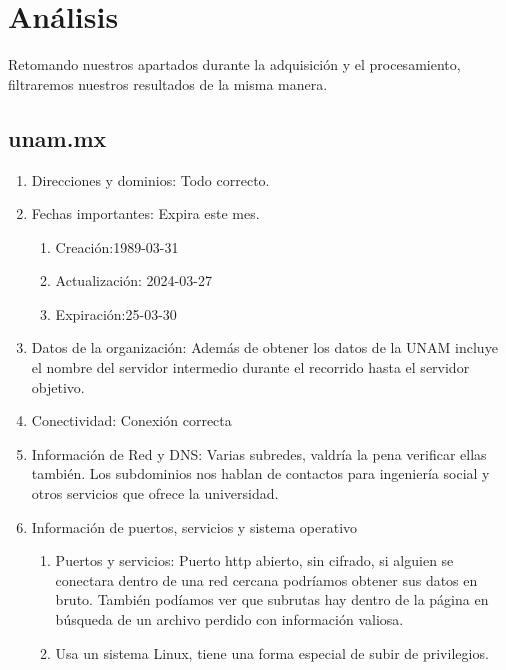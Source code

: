 \section{Análisis}
Retomando nuestros apartados durante la adquisición y el procesamiento, filtraremos nuestros resultados de la misma manera.

\subsection{unam.mx}

\begin{enumerate}
    \item Direcciones y dominios:
        Todo correcto.
    \item Fechas importantes: Expira este mes.
    \begin{enumerate}
        \item Creación:1989-03-31
        \item Actualización: 2024-03-27
        \item Expiración:25-03-30
    \end{enumerate}
    \item Datos de la organización: Además de obtener los datos de la UNAM incluye el nombre del servidor intermedio durante el recorrido hasta el servidor objetivo.

    \item Conectividad: Conexión correcta

    \item Información de Red y DNS: Varias subredes, valdría la pena verificar ellas también. Los subdominios nos hablan de contactos para ingeniería social y otros servicios que ofrece la universidad.

    \item Información de puertos, servicios y sistema operativo
        
        \begin{enumerate}
            \item Puertos y servicios: Puerto http abierto, sin cifrado, si alguien se conectara dentro de una red cercana podríamos obtener sus datos en bruto. También podíamos ver que subrutas hay dentro de la página en búsqueda de un archivo perdido con información valiosa.
            \item Usa un sistema Linux, tiene una forma especial de subir de privilegios.
        \end{enumerate}
\end{enumerate}

